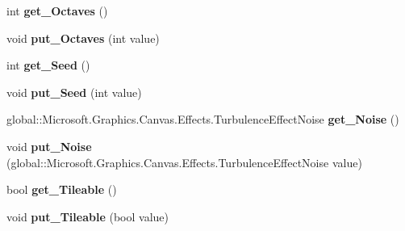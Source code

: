\begin{DoxyCompactItemize}
int {\bfseries get\+\_\+\+Octaves} ()
\item 
\mbox{\label{interface_microsoft_1_1_graphics_1_1_canvas_1_1_effects_1_1_i_turbulence_effect_a48a62385daa2689c9cb13482c43c3513}} 
void {\bfseries put\+\_\+\+Octaves} (int value)
\item 
\mbox{\label{interface_microsoft_1_1_graphics_1_1_canvas_1_1_effects_1_1_i_turbulence_effect_af5fd3f6139436ae5a010c68ce7ab071f}} 
int {\bfseries get\+\_\+\+Seed} ()
\item 
\mbox{\label{interface_microsoft_1_1_graphics_1_1_canvas_1_1_effects_1_1_i_turbulence_effect_a5c5d935930cc55a72aa9a22ade2046dd}} 
void {\bfseries put\+\_\+\+Seed} (int value)
\item 
\mbox{\label{interface_microsoft_1_1_graphics_1_1_canvas_1_1_effects_1_1_i_turbulence_effect_a0607d51d4941f076f4fd0bd3491f5589}} 
global\+::\+Microsoft.\+Graphics.\+Canvas.\+Effects.\+Turbulence\+Effect\+Noise {\bfseries get\+\_\+\+Noise} ()
\item 
\mbox{\label{interface_microsoft_1_1_graphics_1_1_canvas_1_1_effects_1_1_i_turbulence_effect_af647617d63b69c0e66e204d3dbc35129}} 
void {\bfseries put\+\_\+\+Noise} (global\+::\+Microsoft.\+Graphics.\+Canvas.\+Effects.\+Turbulence\+Effect\+Noise value)
\item 
\mbox{\label{interface_microsoft_1_1_graphics_1_1_canvas_1_1_effects_1_1_i_turbulence_effect_a60dd710286094ffebd50bbf6cbcb9ccd}} 
bool {\bfseries get\+\_\+\+Tileable} ()
\item 
\mbox{\label{interface_microsoft_1_1_graphics_1_1_canvas_1_1_effects_1_1_i_turbulence_effect_a16632357dcc2d4e3e5ab07c3eda97095}} 
void {\bfseries put\+\_\+\+Tileable} (bool value)

\end{DoxyCompactItemize}
